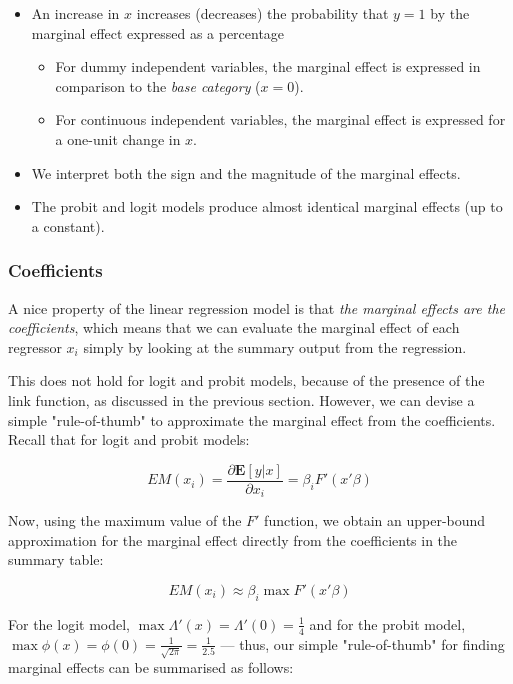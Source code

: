 \begin{itemize}
    \item An increase in $x$ increases (decreases) the probability that $y=1$ by the marginal effect
expressed as a percentage
    \begin{itemize}
        \item For dummy independent variables, the marginal effect is expressed in comparison to the
    \textit{base category} ($x=0$).
        \item For continuous independent variables, the marginal effect is expressed for a one-unit
    change in $x$.
    \end{itemize}
    \item We interpret both the sign and the magnitude of the marginal effects.
    \item The probit and logit models produce almost identical marginal effects (up to a constant).
\end{itemize}

\subsubsection{Coefficients}
A nice property of the linear regression model is that \textit{the marginal effects are the coefficients}, which means that we can evaluate the marginal effect of each regressor $x_i$ simply by looking at the summary output from the regression.

This does not hold for logit and probit models, because of the presence of the link function, as discussed in the previous section. However, we can devise a simple "rule-of-thumb" to approximate the marginal effect from the coefficients. Recall that for logit and probit models:

\begin{equation}
    EM(x_i) = \frac{\partial \mathbf{E}[y|x]}{\partial x_i} = \beta_i F'(x'\beta)
\end{equation}

Now, using the maximum value of the $F'$ function, we obtain an upper-bound approximation for the marginal effect directly from the coefficients in the summary table:

\begin{equation}
    EM(x_i) \approx \beta_i \max F'(x'\beta)
\end{equation}

For the logit model, $\max \Lambda'(x) = \Lambda'(0) = \frac{1}{4}$ and for the probit model, $\max \phi(x) = \phi(0) = \frac{1}{\sqrt{2\pi}} = \frac{1}{2.5}$ --- thus, our simple "rule-of-thumb" for finding marginal effects can be summarised as follows:

